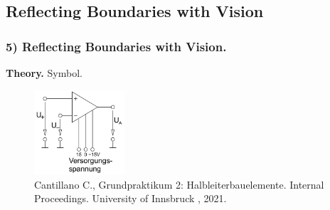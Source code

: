 \subsection{Reflecting Boundaries with Vision}

\begin{frame}
	\frametitle{5) Reflecting Boundaries with Vision.}
	\textbf{Theory.} Symbol.
	\begin{figure}[H]
  		\includegraphics[width=0.3\textwidth]{images/chapter5/8_theory_scheme_operational_amplifier.png} 
  		\caption*{Cantillano C., Grundpraktikum 2: Halbleiterbauelemente. Internal Proceedings. University of Innsbruck , 2021.}
	\end{figure}
\end{frame}